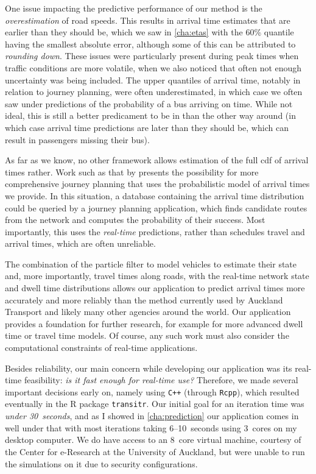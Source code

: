 One issue impacting the predictive performance of our method is the \emph{overestimation} of road speeds. This results in arrival time estimates that are earlier than they should be, which we saw in \cref{cha:etas} with the 60\% quantile having the smallest absolute error, although some of this can be attributed to \emph{rounding down}. These issues were particularly present during peak times when traffic conditions are more volatile, when we also noticed that often not enough uncertainty was being included. The upper quantiles of arrival time, notably in relation to journey planning, were often underestimated, in which case we often saw under predictions of the probability of a bus arriving on time. While not ideal, this is still a better predicament to be in than the other way around (in which case arrival time predictions are later than they should be, which can result in passengers missing their bus).


As far as we know, no other framework allows estimation of the full \gls{cdf} of arrival times rather. Work such as that by \citet{Celan_2017,Celan_2018} presents the possibility for more comprehensive journey planning that uses the probabilistic model of arrival times we provide. In this situation, a database containing the arrival time distribution could be queried by a journey planning application, which finds candidate routes from the network and computes the probability of their success. Most importantly, this uses the \emph{real-time} predictions, rather than schedules travel and arrival times, which are often unreliable.


The combination of the particle filter to model vehicles to estimate their state and, more importantly, travel times along roads, with the real-time network state and dwell time distributions allows our application to predict arrival times more accurately and more reliably than the method currently used by Auckland Transport and likely many other agencies around the world. Our application provides a foundation for further research, for example for more advanced dwell time or travel time models. Of course, any such work must also consider the computational constraints of real-time applications.


Besides reliability, our main concern while developing our application was its real-time feasibility: \emph{is it fast enough for real-time use?} Therefore, we made several important decisions early on, namely using {\tt C++} (through {\tt Rcpp}), which resulted eventually in the R package {\tt transitr}. Our initial goal for an iteration time was \emph{under 30~seconds}, and as I showed in \cref{cha:prediction} our application comes in well under that with most iterations taking 6--10~seconds using 3~cores on my desktop computer. We do have access to an 8~core virtual machine, courtesy of the Center for e-Research at the University of Auckland, but were unable to run the simulations on it due to security configurations.


